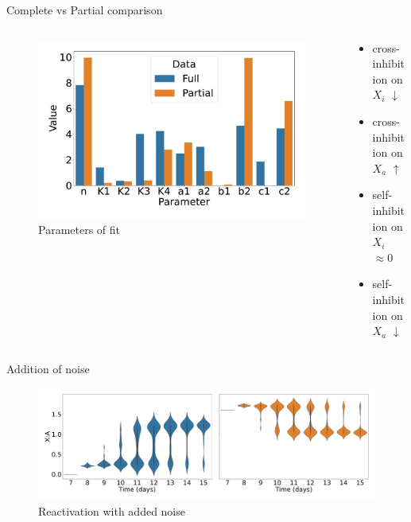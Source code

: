 \documentclass[aspectratio=169,9pt]{beamer}
\begin{document}
    \begin{frame}{Complete vs Partial comparison}
        \begin{columns}
            \begin{column}{0.6\textwidth}
                \begin{figure}[h]
                    \centering
                    \includegraphics[width=\textwidth]{IIII_timeshifted-parmcomp}
                    \caption{Parameters of fit}
                \end{figure}
            \end{column}
            \begin{column}{0.3\textwidth}
                \begin{itemize}
                    \item cross-inhibition on $X_i$ $\downarrow$
                    \item cross-inhibition on $X_a$ $\uparrow$
                    \item self-inhibition on $X_i$ $\approx 0$
                    \item self-inhibition on $X_a$ $\downarrow$
                \end{itemize}
            \end{column}
        \end{columns}
    \end{frame}

    \begin{frame}{Addition of noise}
        \begin{figure}[h]
            \centering
            \includegraphics[width=\textwidth]{IIII-iPSC_timeshifted-noise-violin}
            \caption{Reactivation with added noise}
        \end{figure}
    \end{frame}
\end{document}
